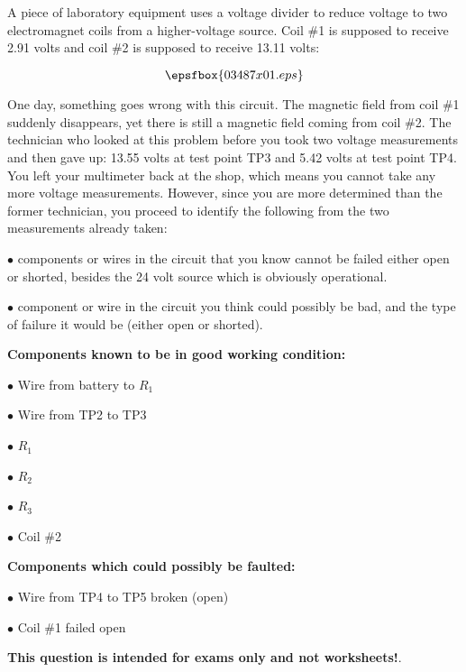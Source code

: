 

A piece of laboratory equipment uses a voltage divider to reduce voltage to two electromagnet coils from a higher-voltage source.  Coil \#1 is supposed to receive 2.91 volts and coil \#2 is supposed to receive 13.11 volts:

$$\epsfbox{03487x01.eps}$$

One day, something goes wrong with this circuit.  The magnetic field from coil \#1 suddenly disappears, yet there is still a magnetic field coming from coil \#2.  The technician who looked at this problem before you took two voltage measurements and then gave up: 13.55 volts at test point TP3 and 5.42 volts at test point TP4.  You left your multimeter back at the shop, which means you cannot take any more voltage measurements.  However, since you are more determined than the former technician, you proceed to identify the following from the two measurements already taken:

\vskip 10pt

\medskip
\item{$\bullet$}  components or wires in the circuit that you know cannot be failed either open or shorted, besides the 24 volt source which is obviously operational.
\vskip 40pt
\item{$\bullet$}  component or wire in the circuit you think could possibly be bad, and the type of failure it would be (either open or shorted).
\medskip







\goodbreak
\noindent
{\bf Components known to be in good working condition:}

\medskip
\item{$\bullet$} Wire from battery to $R_1$
\item{$\bullet$} Wire from TP2 to TP3
\item{$\bullet$} $R_1$
\item{$\bullet$} $R_2$
\item{$\bullet$} $R_3$
\item{$\bullet$} Coil \#2
\medskip

\vskip 10pt

\goodbreak
\noindent
{\bf Components which could possibly be faulted:}

\medskip
\item{$\bullet$} Wire from TP4 to TP5 broken (open)
\item{$\bullet$} Coil \#1 failed open
\medskip







{\bf This question is intended for exams only and not worksheets!}.



